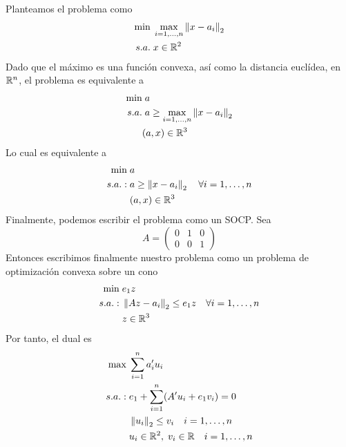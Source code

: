 \documentclass[twoside]{article}
\begin{document}
\begin{solucion}
Planteamos el problema como
\begin{align*}
\min &\; \max_{i=1,\dotsc,n}\left\lVert x-a_i\right\rVert_2\\
s.a.&\; x \in \mathbb{R}^2
\end{align*}
Dado que el máximo es una función convexa, así como la distancia euclídea, en $\mathbb{R}^n$, el problema es equivalente a 
\begin{align*}
\min &\; a\\
s.a.& \;a\geq \max_{i=1,\dotsc,n}\left\lVert x-a_i\right\rVert_2\\
&(a,x)\in \mathbb{R}^3
\end{align*}
Lo cual es equivalente a
\begin{align*}
\min &\; a\\
s.a.:& \;a\geq \left\lVert x-a_i\right\rVert_2 \quad \forall i = 1,\dotsc,n\\
&\;(a,x)\in \mathbb{R}^3
\end{align*}
Finalmente, podemos escribir el problema como un SOCP. Sea 
$$
A=\begin{pmatrix}
0 & 1 & 0\\
0 & 0 & 1
\end{pmatrix}
$$
Entonces escribimos finalmente nuestro problema como un problema de optimización convexa sobre un cono
\begin{align*}
\min &\; e_1 z \\
s.a.:& \; \left\lVert Az-a_i\right\rVert_2\leq e_1 z \quad \forall i = 1,\dotsc,n\\
&\;z\in \mathbb{R}^3
\end{align*}
Por tanto, el dual es
\begin{align*}
\max &\; \sum_{i=1}^n a_i'u_i  \\
s.a.:& \; e_1 + \sum_{i=1}^n (A'u_i + e_1 v_i) = 0\\
&\;\left\lVert u_i\right\rVert_2\leq v_i \quad i=1,\dotsc,n\\
&\;u_i\in \mathbb{R}^2,\; v_i \in \mathbb{R} \quad i=1,\dotsc,n
\end{align*}
\end{solucion}
\end{document}
